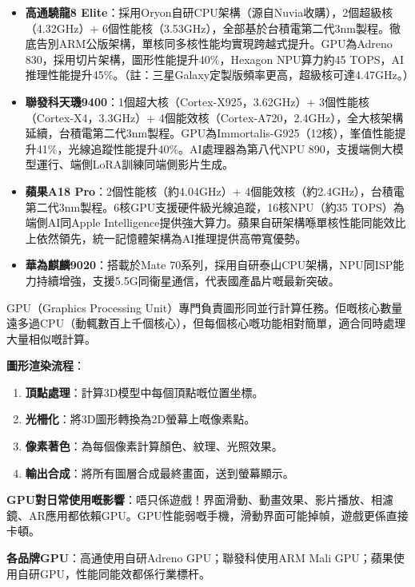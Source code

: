 \begin{itemize}
  \item \textbf{高通驍龍8 Elite}：採用Oryon自研CPU架構（源自Nuvia收購），2個超級核（4.32GHz）+ 6個性能核（3.53GHz），全部基於台積電第二代3nm製程。徹底告別ARM公版架構，單核同多核性能均實現跨越式提升。GPU為Adreno 830，採用切片架構，圖形性能提升40\%，Hexagon NPU算力約45 TOPS，AI推理性能提升45\%。（註：三星Galaxy定製版頻率更高，超級核可達4.47GHz。）
  \item \textbf{聯發科天璣9400}：1個超大核（Cortex-X925，3.62GHz）+ 3個性能核（Cortex-X4，3.3GHz）+ 4個能效核（Cortex-A720，2.4GHz），全大核架構延續，台積電第二代3nm製程。GPU為Immortalis-G925（12核），峯值性能提升41\%，光線追蹤性能提升40\%。AI處理器為第八代NPU 890，支援端側大模型運行、端側LoRA訓練同端側影片生成。
  \item \textbf{蘋果A18 Pro}：2個性能核（約4.04GHz）+ 4個能效核（約2.4GHz），台積電第二代3nm製程。6核GPU支援硬件級光線追蹤，16核NPU（約35 TOPS）為端側AI同Apple Intelligence提供強大算力。蘋果自研架構喺單核性能同能效比上依然領先，統一記憶體架構為AI推理提供高帶寬優勢。
  \item \textbf{華為麒麟9020}：搭載於Mate 70系列，採用自研泰山CPU架構，NPU同ISP能力持續增強，支援5.5G同衞星通信，代表國產晶片嘅最新突破。
\end{itemize}


GPU（Graphics Processing Unit）專門負責圖形同並行計算任務。佢嘅核心數量遠多過CPU（動輒數百上千個核心），但每個核心嘅功能相對簡單，適合同時處理大量相似嘅計算。

\textbf{圖形渲染流程}：

\begin{enumerate}
  \item \textbf{頂點處理}：計算3D模型中每個頂點嘅位置坐標。
  \item \textbf{光柵化}：將3D圖形轉換為2D螢幕上嘅像素點。
  \item \textbf{像素著色}：為每個像素計算顏色、紋理、光照效果。
  \item \textbf{輸出合成}：將所有圖層合成最終畫面，送到螢幕顯示。
\end{enumerate}

\textbf{GPU對日常使用嘅影響}：唔只係遊戲！界面滑動、動畫效果、影片播放、相濾鏡、AR應用都依賴GPU。GPU性能弱嘅手機，滑動界面可能掉幀，遊戲更係直接卡頓。

\textbf{各品牌GPU}：高通使用自研Adreno GPU；聯發科使用ARM Mali GPU；蘋果使用自研GPU，性能同能效都係行業標杆。

